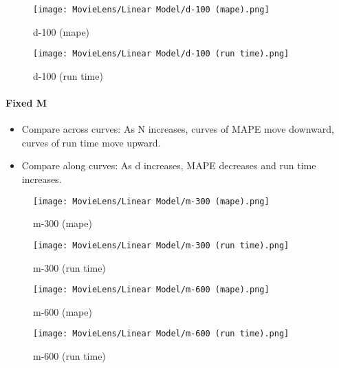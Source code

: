 \documentclass[12pt]{article}
\begin{document}
\begin{figure}[H]
\centering
    \begin{minipage}{0.45\textwidth}
        \centering
        \texttt{[image: MovieLens/Linear Model/d-100 (mape).png]}
        \caption{d-100 (mape)}
        
    \end{minipage}\hfill
    \begin{minipage}{0.45\textwidth}
        \centering
        \texttt{[image: MovieLens/Linear Model/d-100 (run time).png]}
        \caption{d-100 (run time)}
    \end{minipage}
\end{figure}

\paragraph{Fixed M}

\begin{itemize}
\item Compare across curves: As N increases, curves of MAPE move downward, curves of run time move upward.
\item Compare along curves: As d increases, MAPE decreases and run time increases. 
\end{itemize}

\begin{figure}[H]
\centering
    \begin{minipage}{0.45\textwidth}
        \centering
        \texttt{[image: MovieLens/Linear Model/m-300 (mape).png]}
        \caption{m-300 (mape)}
        
    \end{minipage}\hfill
    \begin{minipage}{0.45\textwidth}
        \centering
        \texttt{[image: MovieLens/Linear Model/m-300 (run time).png]}
        \caption{m-300 (run time)}
    \end{minipage}
\end{figure}

\begin{figure}[H]
\centering
    \begin{minipage}{0.45\textwidth}
        \centering
        \texttt{[image: MovieLens/Linear Model/m-600 (mape).png]}
        \caption{m-600 (mape)}
        
    \end{minipage}\hfill
    \begin{minipage}{0.45\textwidth}
        \centering
        \texttt{[image: MovieLens/Linear Model/m-600 (run time).png]}
        \caption{m-600 (run time)}
    \end{minipage}
\end{figure}
\end{document}
